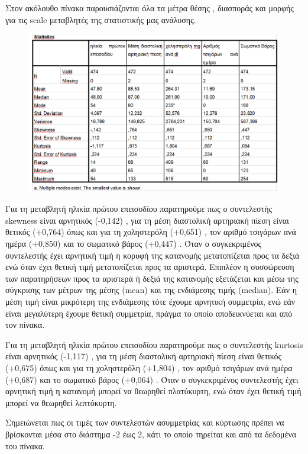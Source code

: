    \clearpage 
    Στον ακόλουθο πίνακα παρουσιάζονται όλα τα μέτρα θέσης , διασποράς και μορφής για τις scale μεταβλητές της στατιστικής μας ανάλυσης.
    
    \begin{figure}[hb]
        \centering
        \includegraphics[width=\textwidth]{images/11.PNG}
    \end{figure}
    
    Για τη μεταβλητή ηλικία πρώτου επεισοδίου παρατηρούμε πως ο συντελεστής  skewness είναι αρνητικός (-0,142) , για τη μέση διαστολική αρτηριακή πίεση είναι θετικός (+0,764) όπως και για τη χοληστερόλη (+0,651) , τον αριθμό τσιγάρων ανά ημέρα (+0,850) και το σωματικό βάρος (+0,447) . Όταν ο συγκεκριμένος συντελεστής έχει αρνητική τιμή η κορυφή της κατανομής μετατοπίζεται προς τα δεξιά ενώ όταν έχει θετική τιμή μετατοπίζεται προς τα αριστερά. Επιπλέον η συσσώρευση των παρατηρήσεων προς τα αριστερά ή δεξιά της κατανομής εξετάζεται και μέσω της σύγκρισης των μέτρων της μέσης (mean) και της ενδιάμεσης τιμής (median). Εάν η μέση τιμή είναι μικρότερη της ενδιάμεσης τότε έχουμε αρνητική συμμετρία, ενώ εάν είναι μεγαλύτερη έχουμε θετική συμμετρία, πράγμα το οποίο αποδεικνύεται και από τον πίνακα.

Για τη μεταβλητή ηλικία πρώτου επεισοδίου παρατηρούμε πως ο συντελεστής  kurtosis είναι αρνητικός (-1,117) , για τη μέση διαστολική αρτηριακή πίεση είναι θετικός (+0,675) όπως και για τη χοληστερόλη (+1,804) , τον αριθμό τσιγάρων ανά ημέρα (+0,687) και το σωματικό βάρος (+0,064) . Όταν ο συγκεκριμένος συντελεστής έχει αρνητική τιμή η κατανομή μπορεί να θεωρηθεί πλατύκυρτη, ενώ όταν έχει θετική τιμή μπορεί να θεωρηθεί λεπτόκυρτη.

Σημειώνεται πως οι τιμές των συντελεστών ασυμμετρίας και κύρτωσης πρέπει να βρίσκονται μέσα στο διάστημα -2 έως 2, κάτι το οποίο τηρείται και από τα δεδομένα του πίνακα.


